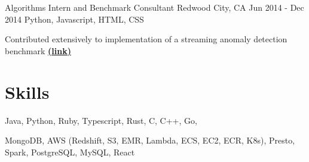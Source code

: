 \documentclass[letterpaper]{simjega-resume}
\begin{document}
{Algorithms Intern and Benchmark Consultant}
{Redwood City, CA}
{Jun 2014 - Dec 2014}
{Python, Javascript, HTML, CSS}
{\begin{tightitemize}
\item[] Contributed extensively to implementation of a streaming anomaly detection benchmark
\href{https://github.com/Numenta/NAB}{\bf (link)}
\end{tightitemize}}






\section{Skills}
\jgsectionline
{}
{
Java,
Python,
Ruby,
Typescript,
Rust,
C,
C++,
Go,
}

{
MongoDB,
AWS (Redshift, S3, EMR, Lambda, ECS, EC2, ECR, K8s),
Presto,
Spark,
PostgreSQL,
MySQL,
React

}
\end{document}
